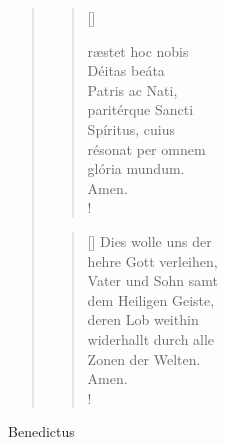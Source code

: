 \begin{quote}
\begin{multicols}{2}
\begin{verse}[\versewidth]

{\normalsize{ræstet hoc nobis\\
Déitas beáta\\
Patris ac Nati,\\
paritérque Sancti\\
Spíritus, cuius\\
résonat per omnem\\
glória mundum.\\
Amen.\\!}}
\end{verse}

\columnbreak

\begin{verse}[\versewidth]
{\normalsize\rm{ Dies wolle uns der\\ 
hehre Gott verleihen,\\
Vater und Sohn samt\\
dem Heiligen Geiste,\\
deren Lob weithin\\
widerhallt durch alle\\ 
Zonen der Welten.\\
Amen.\\!}}

\end{verse}
\end{multicols}

\end{quote}

\begin{flushleft}


\medskip
{\rm{
}}
\end{flushleft}

\medskip





 Benedictus 



